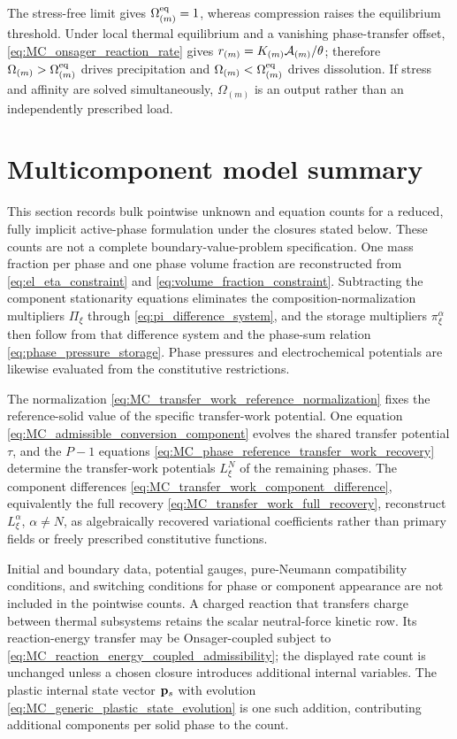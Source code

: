 %
The stress-free limit gives \(\Omega_{(m)}^{\rm eq}=1\), whereas compression
raises the equilibrium threshold.  Under local thermal equilibrium and a
vanishing phase-transfer offset, \eqref{eq:MC_onsager_reaction_rate} gives
\(r_{(m)}=K_{(m)}\mathcal{A}_{(m)}/\theta\); therefore
\(\Omega_{(m)}>\Omega_{(m)}^{\rm eq}\) drives precipitation and
\(\Omega_{(m)}<\Omega_{(m)}^{\rm eq}\) drives dissolution.  If stress and
affinity are solved simultaneously,
\(\Omega_{(m)}\) is an output rather than an independently prescribed load.

\section{Multicomponent model summary}
\label{sec:MC_model_summary_closure_count}

This section records bulk pointwise unknown and equation counts for a reduced,
fully implicit active-phase formulation under the closures stated below.  These
counts are not a complete boundary-value-problem specification.  One mass
fraction per phase and one phase volume fraction are reconstructed from
\eqref{eq:el_eta_constraint} and \eqref{eq:volume_fraction_constraint}.
Subtracting the component stationarity equations eliminates the
composition-normalization multipliers \(\Pi_\xi\) through
\eqref{eq:pi_difference_system}, and the storage multipliers
\(\pi_\xi^\alpha\) then follow from that difference system and the phase-sum
relation \eqref{eq:phase_pressure_storage}.  Phase pressures and
electrochemical potentials are likewise evaluated from the constitutive
restrictions.

The normalization
\eqref{eq:MC_transfer_work_reference_normalization} fixes the reference-solid
value of the specific transfer-work potential.  One equation
\eqref{eq:MC_admissible_conversion_component} evolves the shared transfer
potential \(\tau\), and the \(P-1\) equations
\eqref{eq:MC_phase_reference_transfer_work_recovery} determine the
transfer-work potentials \(L_\xi^N\) of the remaining phases.  The component
differences
\eqref{eq:MC_transfer_work_component_difference}, equivalently the full
recovery \eqref{eq:MC_transfer_work_full_recovery}, reconstruct
\(L_\xi^\alpha\), \(\alpha\ne N\), as algebraically recovered variational
coefficients rather than primary fields or freely prescribed constitutive
functions.

Initial and boundary data, potential gauges, pure-Neumann compatibility
conditions, and switching conditions for phase or component appearance are not
included in the pointwise counts.  A charged reaction that transfers charge
between thermal subsystems retains the scalar neutral-force kinetic row.  Its
reaction-energy transfer may be Onsager-coupled subject to
\eqref{eq:MC_reaction_energy_coupled_admissibility}; the displayed rate count is
unchanged unless a chosen closure introduces additional internal variables.
The plastic internal state vector \(\mathbf{p}_s\) with evolution
\eqref{eq:MC_generic_plastic_state_evolution} is one such addition,
contributing additional components per solid phase to the count.

